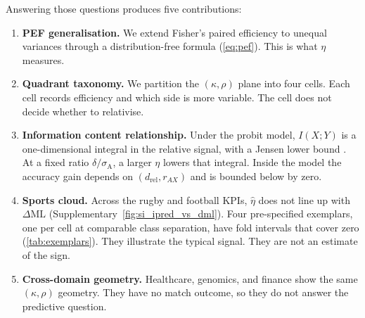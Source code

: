Answering those questions produces five contributions:
\begin{enumerate}
  \item \textbf{PEF generalisation.} We extend Fisher's paired efficiency to unequal variances through a distribution-free formula (\cref{eq:pef}). This is what $\eta$ measures.
  \item \textbf{Quadrant taxonomy.} We partition the $(\kappa,\rho)$ plane into four cells. Each cell records efficiency and which side is more variable. The cell does not decide whether to relativise.
  \item \textbf{Information content relationship.} Under the probit model, $I(X;Y)$ is a one-dimensional integral in the relative signal, with a Jensen lower bound \parencite{cover2006,guyon2003}. At a fixed ratio $\delta/\sigma_{\mathrm{A}}$, a larger $\eta$ lowers that integral. Inside the model the accuracy gain depends on $(d_{\mathrm{rel}},r_{AX})$ and is bounded below by zero.
  \item \textbf{Sports cloud.} Across the rugby and football KPIs, $\hat\eta$ does not line up with $\Delta\mathrm{ML}$ (Supplementary~\cref{fig:si_ipred_vs_dml}). Four pre-specified exemplars, one per cell at comparable class separation, have fold intervals that cover zero (\cref{tab:exemplars}). They illustrate the typical signal. They are not an estimate of the sign.
  \item \textbf{Cross-domain geometry.} Healthcare, genomics, and finance show the same $(\kappa,\rho)$ geometry. They have no match outcome, so they do not answer the predictive question.
\end{enumerate}
